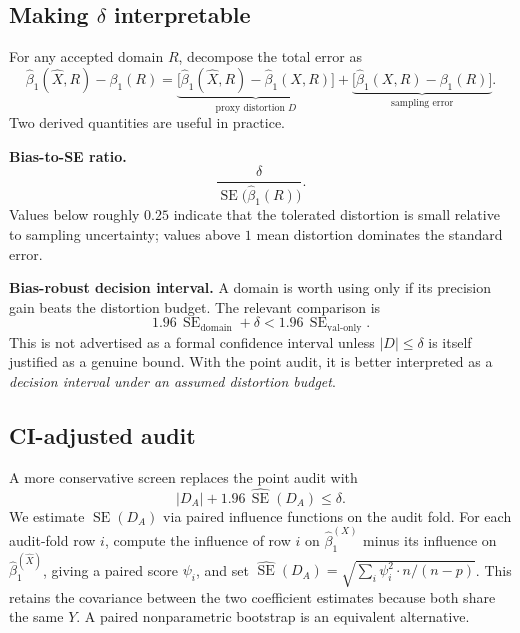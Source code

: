 \documentclass[11pt]{article}
\newcommand{\SE}{\operatorname{SE}}
\newcommand{\1}{\mathbf{1}}
\begin{document}
\subsection{Making $\delta$ interpretable}

For any accepted domain $R$, decompose the total error as
\begin{equation}
\hat\beta_1(\hat X,R)-\beta_1(R)
=
\underbrace{\bigl[\hat\beta_1(\hat X,R)-\hat\beta_1(X,R)\bigr]}_{\text{proxy distortion } D}
+
\underbrace{\bigl[\hat\beta_1(X,R)-\beta_1(R)\bigr]}_{\text{sampling error}}.
\label{eq:error_decomposition}
\end{equation}
Two derived quantities are useful in practice.

\textbf{Bias-to-SE ratio.}
\[
\frac{\delta}{\SE\bigl(\hat\beta_1(R)\bigr)}.
\]
Values below roughly $0.25$ indicate that the tolerated distortion is small relative to sampling uncertainty; values above $1$ mean distortion dominates the standard error.

\textbf{Bias-robust decision interval.} A domain is worth using only if its precision gain beats the distortion budget. The relevant comparison is
\begin{equation}
1.96\,\SE_{\mathrm{domain}}+\delta
<
1.96\,\SE_{\mathrm{val\text{-}only}}.
\label{eq:decision_interval}
\end{equation}
This is not advertised as a formal confidence interval unless $|D|\le\delta$ is itself justified as a genuine bound. With the point audit, it is better interpreted as a \emph{decision interval under an assumed distortion budget}.

\subsection{CI-adjusted audit}

A more conservative screen replaces the point audit with
\begin{equation}
|D_A| + 1.96\,\widehat{\SE}(D_A) \le \delta.
\label{eq:ci_audit}
\end{equation}
We estimate $\SE(D_A)$ via paired influence functions on the audit fold. For each audit-fold row $i$, compute the influence of row $i$ on $\hat\beta_1^{(X)}$ minus its influence on $\hat\beta_1^{(\hat X)}$, giving a paired score $\psi_i$, and set $\widehat{\SE}(D_A) = \sqrt{\sum_i \psi_i^2 \cdot n/(n-p)}$. This retains the covariance between the two coefficient estimates because both share the same $Y$. A paired nonparametric bootstrap is an equivalent alternative.
\end{document}
